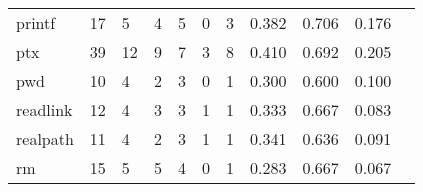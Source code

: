 \begin{longtable}{lp{1.2cm}p{1.2cm}p{1.2cm}p{1.2cm}p{1.2cm}p{1.2cm}p{1.2cm}p{1.2cm}p{1.2cm}p{1.2cm}}
printf    &                                    17 &                                                  5 &                                                  4 &                                                  5 &                                                  0 &                                                  3 &                                              0.382 &                                              0.706 &                                              0.176 \\
ptx       &                                    39 &                                                 12 &                                                  9 &                                                  7 &                                                  3 &                                                  8 &                                              0.410 &                                              0.692 &                                              0.205 \\
pwd       &                                    10 &                                                  4 &                                                  2 &                                                  3 &                                                  0 &                                                  1 &                                              0.300 &                                              0.600 &                                              0.100 \\
readlink  &                                    12 &                                                  4 &                                                  3 &                                                  3 &                                                  1 &                                                  1 &                                              0.333 &                                              0.667 &                                              0.083 \\
realpath  &                                    11 &                                                  4 &                                                  2 &                                                  3 &                                                  1 &                                                  1 &                                              0.341 &                                              0.636 &                                              0.091 \\
rm        &                                    15 &                                                  5 &                                                  5 &                                                  4 &                                                  0 &                                                  1 &                                              0.283 &                                              0.667 &                                              0.067 \\

\end{longtable}
